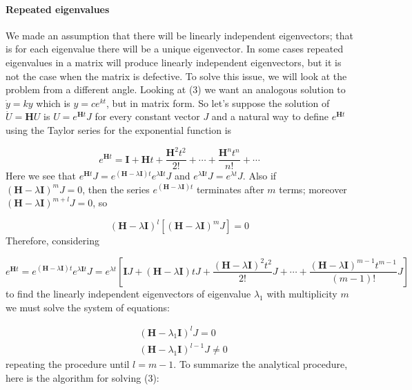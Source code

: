 \documentclass{article}
\begin{document}

			\paragraph{Repeated eigenvalues}We made an assumption that there will be linearly independent eigenvectors; that is for each eigenvalue there will be a unique eigenvector. In some cases repeated eigenvalues in a matrix will produce linearly independent eigenvectors, but it is not the case when the matrix is defective. To solve this issue, we will look at the problem from a different angle. Looking at (3) we want an analogous solution to $ \dot y = ky$ which is $y = ce^{kt}$, but in matrix form. So let's suppose the solution of $\dot{U}=\textbf{H}U$ is $U = e^{\textbf{H}t}J$ for every constant vector $J$ and a natural way to define $e^{\textbf{H}t}$ using the Taylor series for the exponential function is 

 				\begin{equation}
					e^{\textbf{H}t} = \textbf{I} + \textbf{H}t + \frac{\textbf{H}^2t^2}{2!} + \cdots + \frac{\textbf{H}^nt^n}{n!} + \cdots
				\end{equation}
Here we see that $e^{\textbf{H}t}J= e^{(\textbf{H}-\lambda \textbf{I}) t}e^{\lambda \textbf{I} t}J$ and $e^{\lambda \textbf{I} t}J=e^{\lambda t}J$. Also if $(\textbf{H}-\lambda \textbf{I})^mJ = 0$, then the series $e^{(\textbf{H}-\lambda \textbf{I}) t}$ terminates after $m$ terms; moreover $(\textbf{H}-\lambda \textbf{I})^{m+l}J = 0$, so 

				\begin{equation}
					(\textbf{H}-\lambda \textbf{I})^l[(\textbf{H}-\lambda \textbf{I})^mJ]=0
				\end{equation}
Therefore, considering 

				\begin{equation}
					e^{\textbf{H}t} =  e^{(\textbf{H}-\lambda \textbf{I}) t}e^{\lambda \textbf{I} t}J = e^{\lambda t}\left[\textbf{I}J + (\textbf{H}-\lambda \textbf{I})tJ+ \frac{(\textbf{H}-\lambda \textbf{I})^2t^2}{2!}J + \cdots + \frac{(\textbf{H}-\lambda \textbf{I})^{m-1}t^{m-1}}{(m-1)!}J\right]
				\end{equation}
to find the linearly independent eigenvectors of eigenvalue $\lambda_1$ with multiplicity $m$ we must solve the system of equations:

				\begin{align}
					&(\textbf{H}-\lambda_1 \textbf{I})^lJ = 0\\
  					&(\textbf{H}-\lambda_1 \textbf{I})^{l-1}J\neq 0
				\end{align}
repeating the procedure until $l = m-1$.
\newline
To summarize the analytical procedure, here is the algorithm for solving (3):
\end{document}
